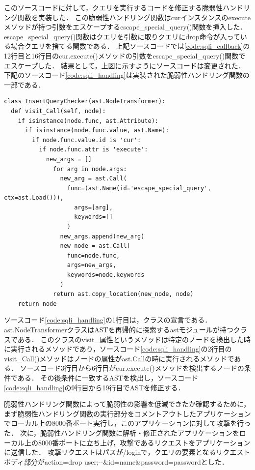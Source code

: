 \documentclass[a4paper,12pt]{jreport}
\begin{document}
このソースコードに対して，クエリを実行するコードを修正する脆弱性ハンドリング関数を実装した．
この脆弱性ハンドリング関数はcurインスタンスのexecuteメソッドが持つ引数をエスケープするescape\_special\_query()関数を挿入した．
escape\_special\_query()関数はクエリを引数に取りクエリにdrop命令が入っている場合クエリを捨てる関数である．
上記ソースコードでは\ref{code:sqli_callback}の12行目と16行目のcur.execute()メソッドの引数をescape\_special\_query()関数でエスケープした．
結果として，上図に示すようにソースコードは変更された．
下記のソースコード\ref{code:sqli_handling}は実装された脆弱性ハンドリング関数の一部である．
\begin{lstlisting}[caption={SQLiの影響を低減するための脆弱性ハンドリング関数の一部}, label=code:sqli_handling, captionpos=b]
class InsertQueryChecker(ast.NodeTransformer):
  def visit_Call(self, node):
    if isinstance(node.func, ast.Attribute):
      if isinstance(node.func.value, ast.Name):
        if node.func.value.id is 'cur':
          if node.func.attr is 'execute':
            new_args = []
              for arg in node.args:
                new_arg = ast.Call(
                  func=(ast.Name(id='escape_special_query', ctx=ast.Load())),
                    args=[arg],
                    keywords=[]
                  )
                new_args.append(new_arg)
                new_node = ast.Call(
                  func=node.func,
                  args=new_args,
                  keywords=node.keywords
                )
              return ast.copy_location(new_node, node)
    return node
\end{lstlisting}
ソースコード\ref{code:sqli_handling}の1行目は，クラスの宣言である．
ast.NodeTransformerクラスはASTを再帰的に探索するastモジュールが持つクラスである．
このクラスのvisit\_属性というメソッドは特定のノードを検出した時に実行されるメソッドであり，ソースコード\ref{code:sqli_handling}の2行目のvisit\_Call()メソッドはノードの属性がast.Callの時に実行されるメソッドである．
ソースコード3行目から6行目がcur.execute()メソッドを検出するノードの条件である．
その後条件に一致するASTを検出し，ソースコード\ref{code:sqli_handling}の9行目から19行目でASTを修正する．

脆弱性ハンドリング関数によって脆弱性の影響を低減できたか確認するために，まず脆弱性ハンドリング関数の実行部分をコメントアウトしたアプリケーションでローカル上の8000番ポート実行し，このアプリケーションに対して攻撃を行った．
次に，脆弱性ハンドリング関数に解析・修正されたアプリケーションをローカル上の8000番ポートに立ち上げ，攻撃であるリクエストをアプリケーションに送信した．
攻撃リクエストはパスが/loginで，クエリの要素となるリクエストボディ部分がaction=drop user;-\--\&id=name\&password=passwordとした．
\end{document}
